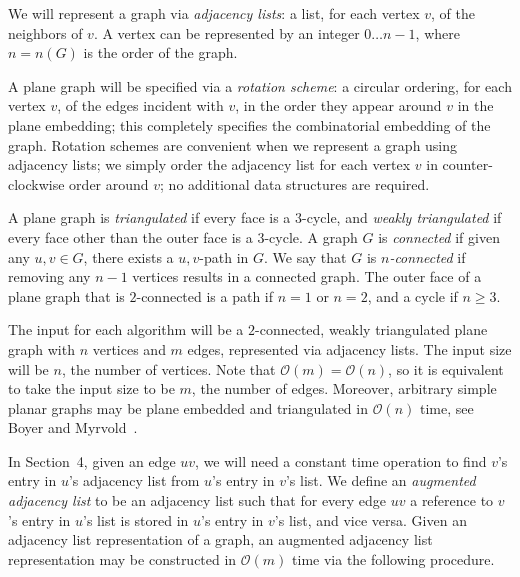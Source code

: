 \documentclass[12pt,letterpaper]{article}
\theoremstyle{plain}
\theoremstyle{definition}
\theoremstyle{break}
\newcommand{\defterm}[1]{\emph{#1}} %
\begin{document}
We will represent a graph via \textit{adjacency lists}:
a list, for each vertex $v$, of the neighbors of $v$.
A vertex can be represented by an integer $0\dots n-1$,
where $n=n(G)$ is the order of the graph.

A plane graph will be specified via
a \defterm{rotation scheme}:
a circular ordering,
for each vertex $v$, of the edges incident with $v$,
in the order they appear around $v$ in the plane embedding;
this completely specifies
the combinatorial embedding of the graph.
Rotation schemes are convenient when we represent a graph
using adjacency lists;
we simply order the adjacency
list for each vertex $v$ in counter-clockwise order around $v$;
no additional data structures are required.

A plane graph is \defterm{triangulated} if every face is a $3$-cycle, and
\defterm{weakly triangulated} if every face other than the
outer face is a $3$-cycle.
A graph $G$ is \defterm{connected} if given any $u,v\in G$, there exists a $u,v$-path in $G$.
We say that $G$ is \defterm{$n$-connected} if removing any $n-1$ vertices results in a
connected graph. The outer face of a plane graph that is $2$-connected
is a path if $n=1$ or $n=2$, and a cycle if $n\ge 3$. 

The input for each algorithm will be a $2$-connected,
weakly triangulated plane graph with $n$ vertices and $m$ edges, represented
via adjacency lists. The input size will be $n$, the number of vertices. Note
that $\mathcal{O}(m)=\mathcal{O}(n)$, so it is equivalent to take the input size
to be $m$, the number of edges. Moreover, arbitrary simple planar graphs may be
plane embedded and triangulated in $\mathcal{O}(n)$ time, see Boyer and
Myrvold~\cite{BoMy2004}.

In Section~4, given an edge $uv$, we will need a constant time operation to
find $v$'s entry in $u$'s adjacency list from $u$'s entry in $v$'s list.
We define an \defterm{augmented adjacency list} to be an adjacency list such
that for
every edge $uv$ a reference to $v$'s entry in
$u$'s list is stored in $u$'s entry in $v$'s list, and vice versa. Given an
adjacency list representation of a graph, an augmented
adjacency list representation may be constructed in $\mathcal{O}(m)$ time via
the following procedure.
\end{document}
